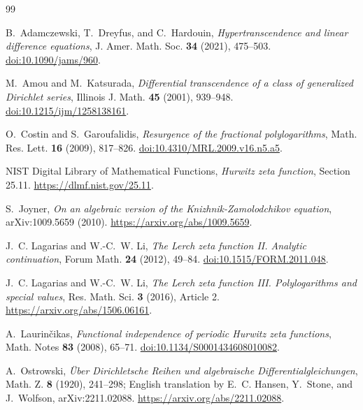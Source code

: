 \documentclass[11pt,reqno]{amsart}
\theoremstyle{definition}
\theoremstyle{remark}
\begin{document}
\begin{thebibliography}{99}

B.~Adamczewski, T.~Dreyfus, and C.~Hardouin,
\emph{Hypertranscendence and linear difference equations},
J. Amer. Math. Soc. \textbf{34} (2021), 475--503.
\href{https://doi.org/10.1090/jams/960}{doi:10.1090/jams/960}.

M.~Amou and M.~Katsurada,
\emph{Differential transcendence of a class of generalized Dirichlet series},
Illinois J. Math. \textbf{45} (2001), 939--948.
\href{https://doi.org/10.1215/ijm/1258138161}{doi:10.1215/ijm/1258138161}.

O.~Costin and S.~Garoufalidis,
\emph{Resurgence of the fractional polylogarithms},
Math. Res. Lett. \textbf{16} (2009), 817--826.
\href{https://doi.org/10.4310/MRL.2009.v16.n5.a5}{doi:10.4310/MRL.2009.v16.n5.a5}.

NIST Digital Library of Mathematical Functions,
\emph{Hurwitz zeta function}, Section 25.11.
\url{https://dlmf.nist.gov/25.11}.

S.~Joyner,
\emph{On an algebraic version of the Knizhnik-Zamolodchikov equation},
arXiv:1009.5659 (2010).
\url{https://arxiv.org/abs/1009.5659}.

J.~C. Lagarias and W.-C.~W. Li,
\emph{The Lerch zeta function II. Analytic continuation},
Forum Math. \textbf{24} (2012), 49--84.
\href{https://doi.org/10.1515/FORM.2011.048}{doi:10.1515/FORM.2011.048}.

J.~C. Lagarias and W.-C.~W. Li,
\emph{The Lerch zeta function III. Polylogarithms and special values},
Res. Math. Sci. \textbf{3} (2016), Article 2.
\url{https://arxiv.org/abs/1506.06161}.

A.~Laurin\v{c}ikas,
\emph{Functional independence of periodic Hurwitz zeta functions},
Math. Notes \textbf{83} (2008), 65--71.
\href{https://doi.org/10.1134/S0001434608010082}{doi:10.1134/S0001434608010082}.

A.~Ostrowski,
\emph{\"Uber Dirichletsche Reihen und algebraische Differentialgleichungen},
Math. Z. \textbf{8} (1920), 241--298; English translation by E.~C. Hansen,
Y.~Stone, and J.~Wolfson, arXiv:2211.02088.
\url{https://arxiv.org/abs/2211.02088}.

\end{thebibliography}
\end{document}
